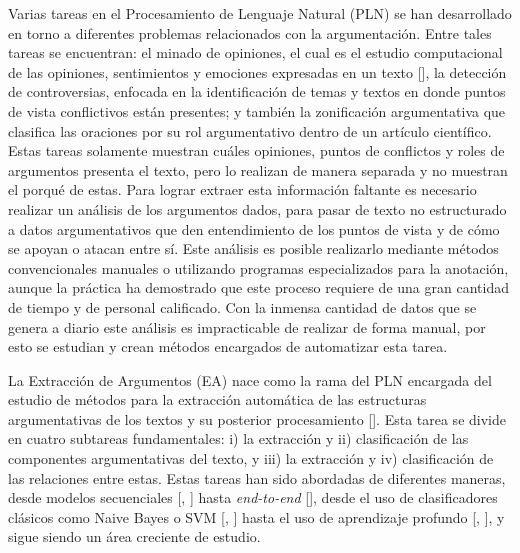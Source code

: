 \documentclass[a4paper,11pt,twocolumn,twoside]{article}
\begin{document}
Varias tareas en el Procesamiento de Lenguaje Natural (PLN) se han desarrollado en 
torno a diferentes problemas relacionados con 
la argumentación. Entre tales tareas se encuentran: el minado de opiniones, el cual es el 
estudio computacional de las opiniones, sentimientos y emociones expresadas en un texto 
[\cite{liu2010sentiment}], la detección de controversias, enfocada en la identificación de 
temas y textos en donde puntos de vista conflictivos están presentes; y también la zonificación
argumentativa que clasifica las oraciones por su rol argumentativo dentro de un artículo
científico. Estas tareas solamente muestran cuáles opiniones, puntos de conflictos y roles 
de argumentos 
presenta el texto, pero lo realizan de manera separada y no muestran el porqué de estas. 
Para lograr extraer esta información faltante es necesario realizar un 
análisis de los argumentos dados, para pasar de texto no estructurado a datos argumentativos 
que den entendimiento de los puntos de vista y de cómo se apoyan o atacan entre sí. Este análisis
es posible realizarlo mediante métodos convencionales manuales o utilizando programas
especializados para la anotación, aunque la práctica ha demostrado que este proceso requiere 
de una gran cantidad de tiempo y de personal calificado. Con la inmensa cantidad de datos 
que se genera a diario este análisis es impracticable de realizar de forma manual, por esto se 
estudian y crean métodos encargados de automatizar esta tarea.


La Extracción de Argumentos (EA) nace como la rama del PLN encargada
del estudio de métodos para la extracción automática de las estructuras argumentativas de 
los textos y su posterior procesamiento [\cite{lawrence2020argument}]. Esta tarea se divide en 
cuatro subtareas fundamentales: i) la extracción y ii) clasificación de las componentes 
argumentativas del texto, y iii) la extracción y 
iv) clasificación de las relaciones entre estas. Estas tareas han sido abordadas de diferentes maneras,
desde modelos secuenciales [\cite{palau2009argumentation}, \cite{goudas2015argument}] hasta 
\textit{end-to-end} [\cite{eger2017neural}], desde el uso de clasificadores clásicos 
como Naive Bayes o SVM [\cite{niculae2017argument}, \cite{stab2017parsing}] hasta el uso de 
aprendizaje profundo [\cite{galassi2021deep}, \cite{mayer2020transformer}], y sigue 
siendo un área creciente de estudio.
\end{document}
